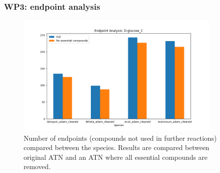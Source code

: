 \documentclass[serif,10pt,aspectratio=169]{beamer}
\begin{document}
\begin{frame}\frametitle{WP3: endpoint analysis}
	\begin{figure}
		\includegraphics[height=6cm]{images/01_endpoint_analysis.png}
		\caption{Number of endpoints (compounds not used in further reactions) compared between the species.  Results are compared between original ATN and an ATN where all essential compounds are removed.}
	\end{figure}
\end{frame}



\end{document}
